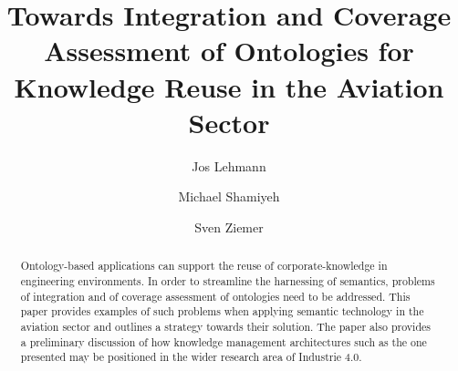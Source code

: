\documentclass[runningheads,a4paper]{llncs}
\begin{document}
\mainmatter

\title{Towards Integration and Coverage Assessment of Ontologies for Knowledge Reuse in the Aviation Sector}
\author{Jos Lehmann \and
Michael Shamiyeh \and
Sven Ziemer}
\maketitle

\begin{abstract}
Ontology-based applications can support the reuse of corporate-knowledge in engineering environments. In order to streamline the harnessing of semantics, problems of integration and of coverage assessment of ontologies need to be addressed. This paper provides examples of such problems when applying semantic technology in the aviation sector and outlines a strategy towards their solution. The paper also provides a preliminary discussion of how knowledge management architectures such as the one presented may be positioned in the wider research area of Industrie 4.0.

\end{abstract}
\end{document}
